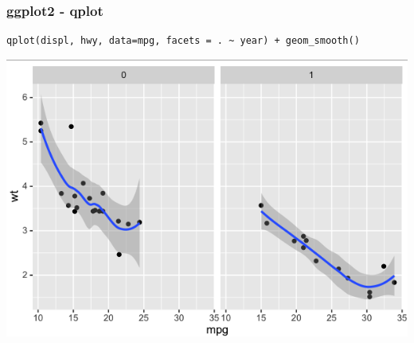 \documentclass{beamer}
\begin{document}
\begin{frame}[fragile]
\frametitle{ggplot2 - qplot}
\scriptsize
\begin{verbatim}
qplot(displ, hwy, data=mpg, facets = . ~ year) + geom_smooth()
\end{verbatim}
\begin{center}
\includegraphics{../IMG/qplot2.png}
\end{center}
\end{frame}


%


\end{document}
